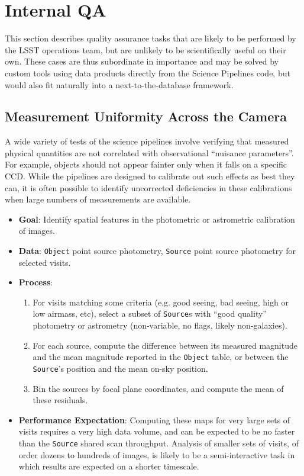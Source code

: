 \documentclass[DM,authoryear,toc]{lsstdoc}
\begin{document}

\section{Internal QA}

This section describes quality assurance tasks that are likely to be performed
by the LSST operations team, but are unlikely to be scientifically useful on
their own. These cases are thus subordinate in importance and may be solved by
custom tools using data products directly from the Science Pipelines code, but
would also fit naturally into a next-to-the-database framework.

\subsection{Measurement Uniformity Across the Camera}

A wide variety of tests of the science pipelines involve verifying that measured
physical quantities are not correlated with observational ``nuisance
parameters''. For example, objects should not appear fainter only when it falls
on a specific CCD. While the pipelines are designed to calibrate out such
effects as best they can, it is often possible to identify uncorrected
deficiencies in these calibrations when large numbers of measurements are
available.

\begin{itemize}
  \item \textbf{Goal}: Identify spatial features in the photometric or
  astrometric calibration of images.
  \item \textbf{Data}: \texttt{Object} point source photometry, \texttt{Source}
  point source photometry for selected visits.
  \item \textbf{Process}:
  \begin{enumerate}
    \item For visits matching some criteria (e.g. good seeing, bad seeing, high
    or low airmass, etc), select a subset of \texttt{Source}s with ``good quality''
    photometry or astrometry (non-variable, no flags, likely non-galaxies).
    \item For each source, compute the difference between its measured magnitude
    and the mean magnitude reported in the \texttt{Object} table, or between the
    \texttt{Source}'s position and the mean on-sky position.
    \item Bin the sources by focal plane coordinates, and compute the mean of
    these residuals.
  \end{enumerate}
  \item \textbf{Performance Expectation}: Computing these maps for very large
  sets of visits requires a very high data volume, and can be expected to be no
  faster than the \texttt{Source} shared scan throughput. Analysis of smaller
  sets of visits, of order dozens to hundreds of images, is likely to be a
  semi-interactive task in which results are expected on a shorter timescale.
\end{itemize}


\end{document}
